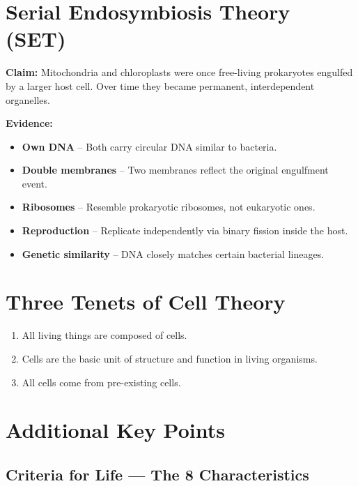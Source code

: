 \documentclass[11pt, letterpaper]{article}
\begin{document}
\section*{Serial Endosymbiosis Theory (SET)}

\textbf{Claim:} Mitochondria and chloroplasts were once free-living prokaryotes engulfed by a larger host cell. Over time they became permanent, interdependent organelles.

\vspace{4pt}\textbf{Evidence:}
\begin{itemize}[noitemsep]
  \item \textbf{Own DNA} -- Both carry circular DNA similar to bacteria.
  \item \textbf{Double membranes} -- Two membranes reflect the original engulfment event.
  \item \textbf{Ribosomes} -- Resemble prokaryotic ribosomes, not eukaryotic ones.
  \item \textbf{Reproduction} -- Replicate independently via binary fission inside the host.
  \item \textbf{Genetic similarity} -- DNA closely matches certain bacterial lineages.
\end{itemize}

\section*{Three Tenets of Cell Theory}

\begin{enumerate}[noitemsep]
  \item All living things are composed of cells.
  \item Cells are the basic unit of structure and function in living organisms.
  \item All cells come from pre-existing cells.
\end{enumerate}

\section*{Additional Key Points}

\subsection*{Criteria for Life --- The 8 Characteristics}
\end{document}
